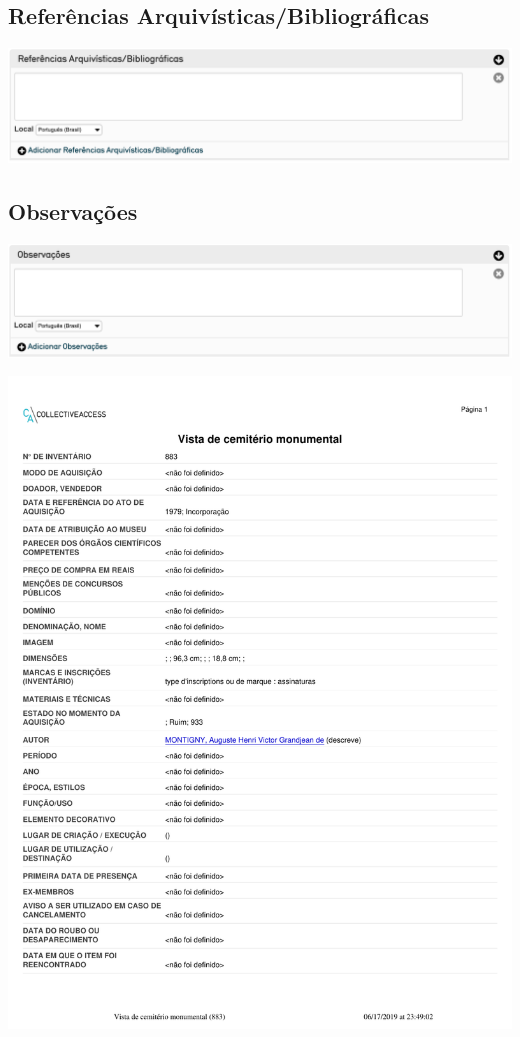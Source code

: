\subsection{Referências Arquivísticas/Bibliográficas}
\begin{flushleft}
	\includegraphics[width=\linewidth]{elemento-24}
\end{flushleft}

\subsection{Observações}
\begin{flushleft}
	\includegraphics[width=\linewidth]{elemento-25}
\end{flushleft}

\includegraphics{resumo}